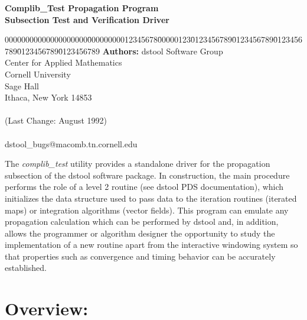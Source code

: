 




\begin{center}
{\LARGE \bf Complib\_Test Propagation Program}  \\

\vspace{.15in}
{\large \bf Subsection Test and Verification Driver}
\end{center}

\vspace{.2in}
\begin{tabbing}
00000000000000000000\=00000000012345678\=00000123\=0123456789\=0123456789\=0123456789\=0123456789\=0123456789 \kill
\> {\bf Authors: }\> dstool Software Group \\
\> \>        Center for Applied Mathematics  \\
\> \>        Cornell University \\
\>  Sage Hall \\
\> \>        Ithaca, New York \hspace{.1in}  14853 \\
\> \>          \>   \\
 \hspace{.07in}  (Last Change: August 1992)   \\
\>             \>   \\
 \> dstool\_bugs@macomb.tn.cornell.edu
\end{tabbing}
\vspace{.2in}

  The {\em complib\_test} utility provides a standalone driver for
the propagation subsection of the dstool software package.
In construction, the main procedure performs the role of
a level 2 routine (see dstool PDS documentation), which initializes the data structure 
used to pass data to the iteration routines (iterated maps) or integration
algorithms (vector fields).  This program can emulate any propagation calculation which can
be performed by dstool and, in addition, allows the programmer or algorithm designer the
opportunity to study the implementation of a new routine apart from the interactive windowing
system so that properties such as convergence and timing behavior can be accurately established.
\vspace{.15in}

\section{Overview:}

